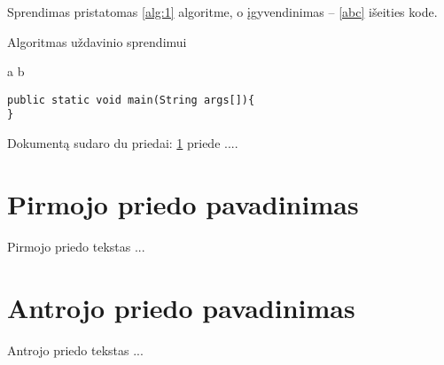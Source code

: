\documentclass[a4paper,12pt,fleqn]{article}
\begin{document}
Sprendimas pristatomas \ref{alg:1} algoritme, o įgyvendinimas -- \ref{abc} išeities kode.

\begin{algorithm}\caption{Algoritmas uždavinio sprendimui}
  \label{alg:1}
  \begin{algorithmic}
    \REQUIRE 
    \ENSURE 
\STATE a \AND b
\end{algorithmic}


\end{algorithm}



\begin{lstlisting}[caption={Pagrindinio metodo žingsniai},label={abc}]
public static void main(String args[]){
}
\end{lstlisting}








\newpage
\begin{appendices}
Dokumentą sudaro du priedai: \ref{app:a} priede  ....
\newpage
\section{Pirmojo priedo pavadinimas}
\label{app:a}
Pirmojo priedo tekstas ...

\newpage
\section{Antrojo priedo pavadinimas}
Antrojo priedo tekstas ...

\end{appendices}
\end{document}
